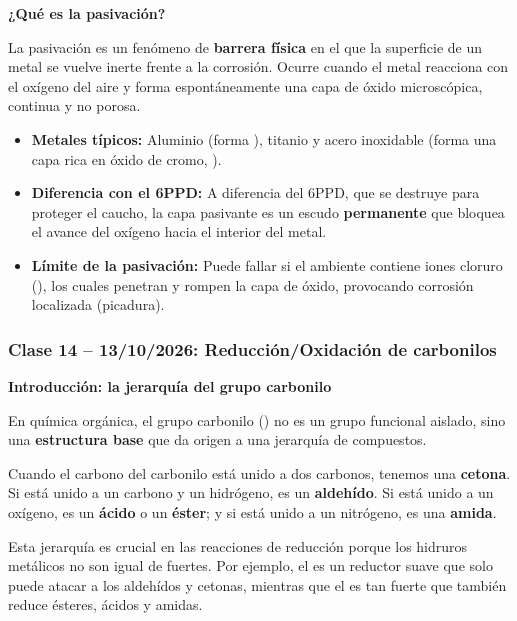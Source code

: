 \textbf{¿Qué es la pasivación?}

La pasivación es un fenómeno de \textbf{barrera física} en el que la superficie 
de un metal se vuelve inerte frente a la corrosión. Ocurre cuando el metal 
reacciona con el oxígeno del aire y forma espontáneamente una capa de óxido 
microscópica, continua y no porosa.

\begin{itemize}
    \item \textbf{Metales típicos:} Aluminio (forma ), titanio y acero 
    inoxidable (forma una capa rica en óxido de cromo, ).
    \item \textbf{Diferencia con el 6PPD:} A diferencia del 6PPD, que se destruye 
    para proteger el caucho, la capa pasivante es un escudo \textbf{permanente} 
    que bloquea el avance del oxígeno hacia el interior del metal.
    \item \textbf{Límite de la pasivación:} Puede fallar si el ambiente contiene 
    iones cloruro (), los cuales penetran y rompen la capa de óxido, 
    provocando corrosión localizada (picadura).
\end{itemize}

{}
\subsubsection*{\textcolor{blueunam}{Clase 14 -- 13/10/2026: Reducción/Oxidación de carbonilos}}

\textbf{Introducción: la jerarquía del grupo carbonilo}

En química orgánica, el grupo carbonilo () no es un grupo funcional 
aislado, sino una \textbf{estructura base} que da origen a una jerarquía 
de compuestos. 

Cuando el carbono del carbonilo está unido a dos carbonos, tenemos una 
\textbf{cetona}. Si está unido a un carbono y un hidrógeno, es un 
\textbf{aldehído}. Si está unido a un oxígeno, es un \textbf{ácido} o un 
\textbf{éster}; y si está unido a un nitrógeno, es una \textbf{amida}.

Esta jerarquía es crucial en las reacciones de reducción porque los 
hidruros metálicos no son igual de fuertes. Por ejemplo, el  
es un reductor suave que solo puede atacar a los aldehídos y cetonas, 
mientras que el  es tan fuerte que también reduce ésteres, 
ácidos y amidas.

